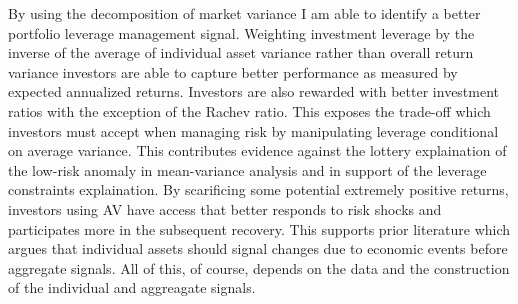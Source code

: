 By using the decomposition of market variance I am able to identify a better portfolio leverage management signal. Weighting investment leverage by the inverse of the average of individual asset variance rather than overall return variance investors are able to capture better performance as measured by expected annualized returns. Investors are also rewarded with better investment ratios with the exception of the Rachev ratio. This exposes the trade-off which investors must accept when managing risk by manipulating leverage conditional on average variance. This contributes evidence against the lottery explaination of the low-risk anomaly in mean-variance analysis and in support of the leverage constraints explaination. By scarificing some potential extremely positive returns, investors using AV have access that better responds to risk shocks and participates more in the subsequent recovery. This supports prior literature which argues that individual assets should signal changes due to economic events before aggregate signals. All of this, of course, depends on the data and the construction of the individual and aggreagate signals.